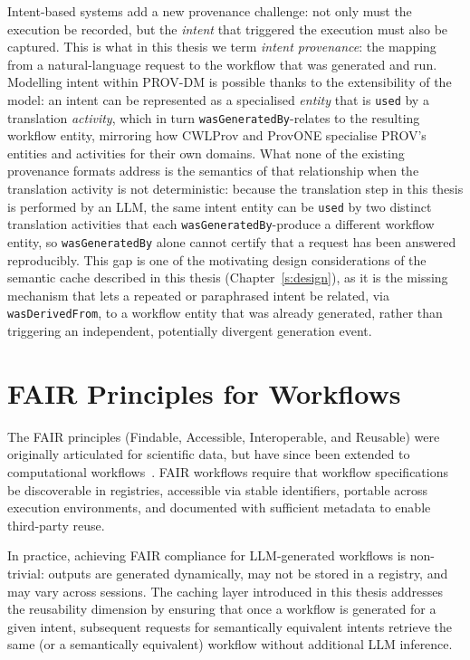 Intent-based systems add a new provenance challenge: not only must the execution
be recorded, but the \emph{intent} that triggered the execution must also be
captured. This is what in this thesis we term \emph{intent provenance}: the mapping from a
natural-language request to the workflow that was generated and run. Modelling
intent within PROV-DM is possible thanks to the extensibility of the model: an intent can
be represented as a specialised \emph{entity} that is \texttt{used} by a
translation \emph{activity}, which in turn \texttt{wasGeneratedBy}-relates to
the resulting workflow entity, mirroring how CWLProv and ProvONE specialise
PROV's entities and activities for their own domains. What none of the
existing provenance formats address is the semantics of that relationship
when the translation activity is not deterministic: because the translation
step in this thesis is performed by an LLM, the same intent entity can be
\texttt{used} by two distinct translation activities that each
\texttt{wasGeneratedBy}-produce a different workflow entity, so
\texttt{wasGeneratedBy} alone cannot certify that a request has been answered
reproducibly. This gap is one of the motivating design considerations of the
semantic cache described in this thesis (Chapter~\ref{s:design}), as it is 
the missing mechanism that lets a repeated or paraphrased intent be
related, via \texttt{wasDerivedFrom}, to a workflow entity that was already
generated, rather than triggering an independent, potentially divergent
generation event.

\section{FAIR Principles for Workflows}

The FAIR principles (Findable, Accessible, Interoperable, and
Reusable) were originally articulated for scientific data, but have since been
extended to computational workflows~\cite{goble2020fair}. FAIR workflows require
that workflow specifications be discoverable in registries, accessible via
stable identifiers, portable across execution environments, and documented with
sufficient metadata to enable third-party reuse.

In practice, achieving FAIR compliance for LLM-generated workflows is
non-trivial: outputs are generated dynamically, may not be stored in a registry,
and may vary across sessions. The caching layer introduced in this thesis
addresses the reusability dimension by ensuring that once a workflow is generated
for a given intent, subsequent requests for semantically equivalent intents
retrieve the same (or a semantically equivalent) workflow without additional
LLM inference.

